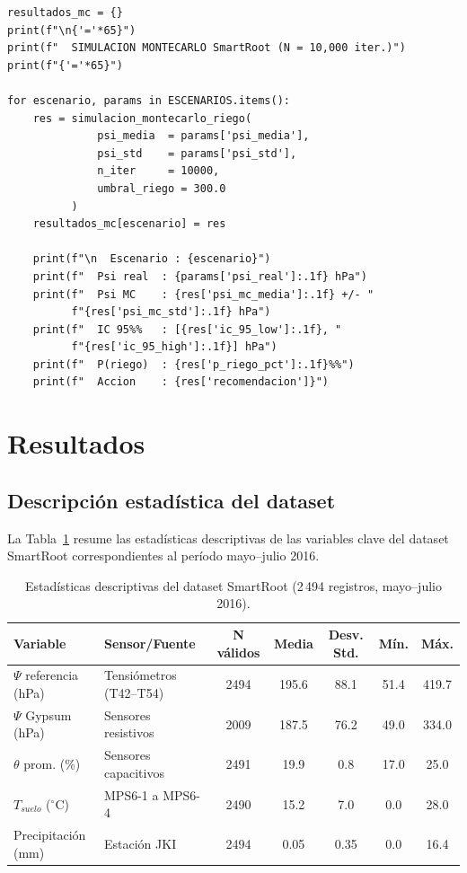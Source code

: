 \documentclass[12pt,a4paper]{article}
\begin{document}
\begin{lstlisting}[caption={Simulación de Montecarlo con 10\,000 iteraciones por escenario estacional.}, label=lst:montecarlo]
resultados_mc = {}
print(f"\n{'='*65}")
print(f"  SIMULACION MONTECARLO SmartRoot (N = 10,000 iter.)")
print(f"{'='*65}")

for escenario, params in ESCENARIOS.items():
    res = simulacion_montecarlo_riego(
              psi_media  = params['psi_media'],
              psi_std    = params['psi_std'],
              n_iter     = 10000,
              umbral_riego = 300.0
          )
    resultados_mc[escenario] = res
    
    print(f"\n  Escenario : {escenario}")
    print(f"  Psi real  : {params['psi_real']:.1f} hPa")
    print(f"  Psi MC    : {res['psi_mc_media']:.1f} +/- "
          f"{res['psi_mc_std']:.1f} hPa")
    print(f"  IC 95%%   : [{res['ic_95_low']:.1f}, "
          f"{res['ic_95_high']:.1f}] hPa")
    print(f"  P(riego)  : {res['p_riego_pct']:.1f}%%")
    print(f"  Accion    : {res['recomendacion']}")
\end{lstlisting}

\section{Resultados}

\subsection{Descripción estadística del dataset}

La Tabla~\ref{tab:estadisticas} resume las estadísticas descriptivas de las variables clave del dataset SmartRoot correspondientes al período mayo--julio 2016.

\begin{table}[H]
\centering
\small
\caption{Estadísticas descriptivas del dataset SmartRoot (2\,494 registros, mayo--julio 2016).}
\label{tab:estadisticas}
\begin{tabular}{@{}llccccc@{}}
\toprule
\textbf{Variable} & \textbf{Sensor/Fuente} & \textbf{N válidos} & \textbf{Media} & \textbf{Desv. Std.} & \textbf{Mín.} & \textbf{Máx.} \\
\midrule
$\Psi$ referencia (hPa) & Tensiómetros (T42--T54) & 2494 & 195.6 & 88.1 & 51.4 & 419.7 \\
$\Psi$ Gypsum (hPa) & Sensores resistivos & 2009 & 187.5 & 76.2 & 49.0 & 334.0 \\
$\theta$ prom. (\%) & Sensores capacitivos & 2491 & 19.9 & 0.8 & 17.0 & 25.0 \\
$T_{suelo}$ ($^\circ$C) & MPS6-1 a MPS6-4 & 2490 & 15.2 & 7.0 & 0.0 & 28.0 \\
Precipitación (mm) & Estación JKI & 2494 & 0.05 & 0.35 & 0.0 & 16.4 \\
\bottomrule
\end{tabular}
\end{table}
\end{document}
